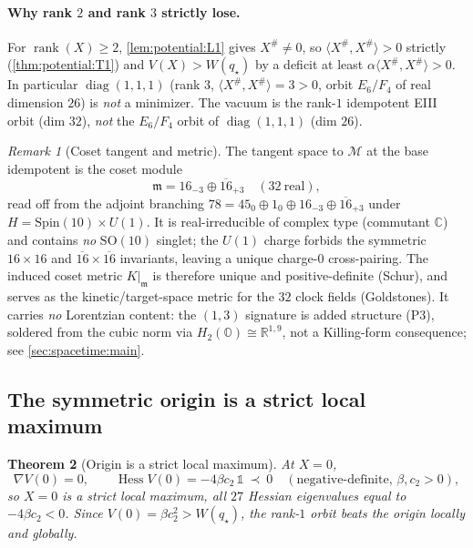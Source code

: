 \documentclass[11pt]{article}
\theoremstyle{plain}
\newtheorem{theorem}{Theorem}[section]
\theoremstyle{definition}
\theoremstyle{remark}
\newtheorem{remark}[theorem]{Remark}
\begin{document}
\paragraph{Why rank $2$ and rank $3$ strictly lose.}
For $\operatorname{rank}(X)\ge2$, \autoref{lem:potential:L1} gives $X^\#\neq0$, so
$\langle X^\#,X^\#\rangle>0$ strictly (\autoref{thm:potential:T1}) and
$V(X)>W(q_\star)$ by a deficit at least $\alpha\langle X^\#,X^\#\rangle>0$. In particular
$\operatorname{diag}(1,1,1)$ (rank $3$, $\langle X^\#,X^\#\rangle=3>0$, orbit $E_6/F_4$ of
real dimension $26$) is \emph{not} a minimizer. The vacuum is the rank-$1$ idempotent EIII
orbit (dim $32$), \emph{not} the $E_6/F_4$ orbit of $\operatorname{diag}(1,1,1)$ (dim $26$).

\begin{remark}[Coset tangent and metric]
\label{rmk:potential:tangent}
The tangent space to $\mathcal M$ at the base idempotent is the coset module
\begin{equation}
\label{eq:potential:cosettangent}
\mathfrak m=16_{-3}\oplus\overline{16}_{+3}\quad(32\ \text{real}),
\end{equation}
read off from the adjoint branching $78=45_0\oplus1_0\oplus16_{-3}\oplus\overline{16}_{+3}$
under $H=\mathrm{Spin}(10)\times U(1)$. It is real-irreducible of complex type (commutant
$\mathbb C$) and contains \emph{no} $\mathrm{SO}(10)$ singlet; the $U(1)$ charge forbids the
symmetric $16\times16$ and $\overline{16}\times\overline{16}$ invariants, leaving a unique
charge-$0$ cross-pairing. The induced coset metric $K|_{\mathfrak m}$ is therefore unique and
positive-definite (Schur), and serves as the kinetic/target-space metric for the $32$ clock
fields (Goldstones). It carries \emph{no} Lorentzian content: the $(1,3)$ signature is added
structure (P3), soldered from the cubic norm via $H_2(\mathbb O)\cong\mathbb R^{1,9}$, not a
Killing-form consequence; see \autoref{sec:spacetime:main}.
\end{remark}

\subsection{The symmetric origin is a strict local maximum}
\label{sec:potential:origin}

\begin{theorem}[Origin is a strict local maximum]
\label{thm:potential:T5}
At $X=0$,
\begin{equation}
\label{eq:potential:hess0}
\nabla V(0)=0,\qquad
\operatorname{Hess}V(0)=-4\beta c_2\,\mathbb 1\ \prec\ 0
\quad(\text{negative-definite, }\beta,c_2>0),
\end{equation}
so $X=0$ is a strict local maximum, all $27$ Hessian eigenvalues equal to $-4\beta c_2<0$.
Since $V(0)=\beta c_2^2>W(q_\star)$, the rank-$1$ orbit beats the origin locally and globally.
\end{theorem}
\end{document}
